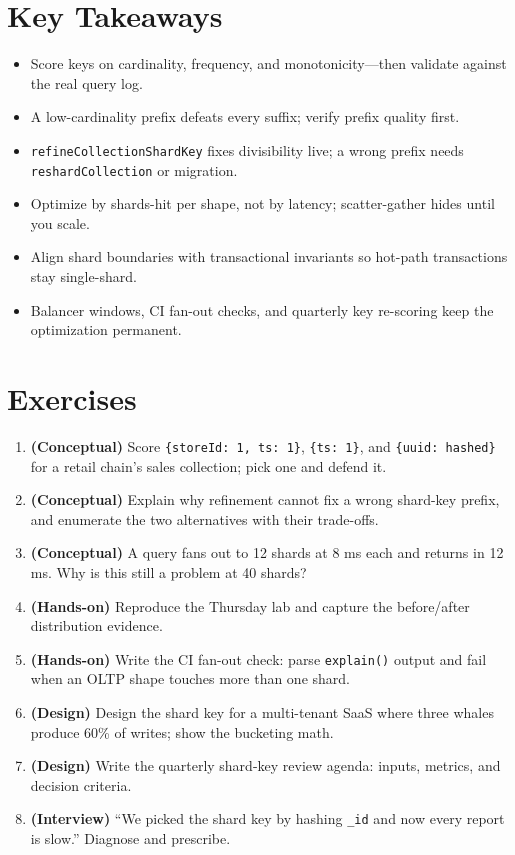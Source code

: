 \section*{Key Takeaways}
\begin{itemize}
    \item Score keys on cardinality, frequency, and monotonicity---then validate against the real query log.
    \item A low-cardinality prefix defeats every suffix; verify prefix quality first.
    \item \texttt{refineCollectionShardKey} fixes divisibility live; a wrong prefix needs \texttt{reshardCollection} or migration.
    \item Optimize by shards-hit per shape, not by latency; scatter-gather hides until you scale.
    \item Align shard boundaries with transactional invariants so hot-path transactions stay single-shard.
    \item Balancer windows, CI fan-out checks, and quarterly key re-scoring keep the optimization permanent.
\end{itemize}

\section{Exercises}
\begin{enumerate}
    \item \textbf{(Conceptual)} Score \texttt{\{storeId: 1, ts: 1\}}, \texttt{\{ts: 1\}}, and \texttt{\{uuid: hashed\}} for a retail chain's sales collection; pick one and defend it.
    \item \textbf{(Conceptual)} Explain why refinement cannot fix a wrong shard-key prefix, and enumerate the two alternatives with their trade-offs.
    \item \textbf{(Conceptual)} A query fans out to 12 shards at 8 ms each and returns in 12 ms. Why is this still a problem at 40 shards?
    \item \textbf{(Hands-on)} Reproduce the Thursday lab and capture the before/after distribution evidence.
    \item \textbf{(Hands-on)} Write the CI fan-out check: parse \texttt{explain()} output and fail when an OLTP shape touches more than one shard.
    \item \textbf{(Design)} Design the shard key for a multi-tenant SaaS where three whales produce 60\% of writes; show the bucketing math.
    \item \textbf{(Design)} Write the quarterly shard-key review agenda: inputs, metrics, and decision criteria.
    \item \textbf{(Interview)} ``We picked the shard key by hashing \texttt{\_id} and now every report is slow.'' Diagnose and prescribe.
\end{enumerate}

